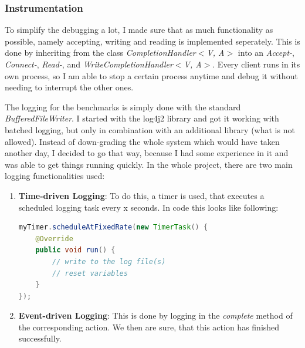 \documentclass[11pt]{article}
\begin{document}
\subsubsection{Instrumentation}\label{sec:instrumentation}
 To simplify the debugging a lot, I made sure that as much functionality as possible, namely accepting, writing and reading is implemented seperately. This is done by inheriting from the class \textit{CompletionHandler$<$V, A$>$} into an \textit{Accept-}, \textit{Connect-}, \textit{Read-}, and \textit{WriteCompletionHandler$<$V, A$>$}. Every client runs in its own process, so I am able to stop a certain process anytime and debug it without needing to interrupt the other ones.
 
 The logging for the benchmarks is simply done with the standard \textit{BufferedFileWriter}. I started with the log4j2 library and got it working with batched logging, but only in combination with an additional library (what is not allowed). Instead of down-grading the whole system which would have taken another day, I decided to go that way, because I had some experience in it and was able to get things running quickly. In the whole project, there are two main logging functionalities used:
 \begin{enumerate}
 	\item \textbf{Time-driven Logging}: To do this, a timer is used, that executes a scheduled logging task every x seconds. In code this looks like following:
\begin{lstlisting}[basicstyle=\small, language=Java]
myTimer.scheduleAtFixedRate(new TimerTask() {
    @Override
    public void run() {
        // write to the log file(s)
        // reset variables
    }
});
\end{lstlisting}
	\item \textbf{Event-driven Logging}: This is done by logging in the \textit{complete} method of the corresponding action. We then are sure, that this action has finished successfully.
\end{enumerate}
 
\end{document}
